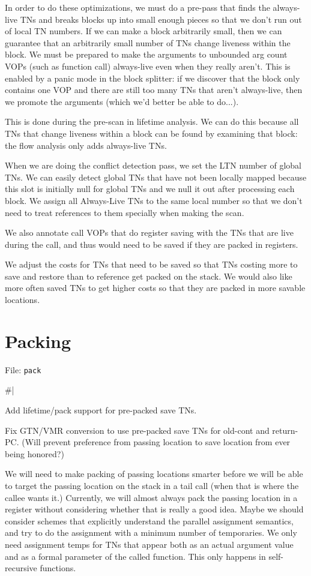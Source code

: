 In order to do these optimizations, we must do a pre-pass that finds the
always-live TNs and breaks blocks up into small enough pieces so that we don't
run out of local TN numbers.  If we can make a block arbitrarily small, then we
can guarantee that an arbitrarily small number of TNs change liveness within
the block.  We must be prepared to make the arguments to unbounded arg count
VOPs (such as function call) always-live even when they really aren't.  This is
enabled by a panic mode in the block splitter: if we discover that the block
only contains one VOP and there are still too many TNs that aren't always-live,
then we promote the arguments (which we'd better be able to do...).

This is done during the pre-scan in lifetime analysis.  We can do this because
all TNs that change liveness within a block can be found by examining that
block: the flow analysis only adds always-live TNs.


When we are doing the conflict detection pass, we set the LTN number of global
TNs.  We can easily detect global TNs that have not been locally mapped because
this slot is initially null for global TNs and we null it out after processing
each block.  We assign all Always-Live TNs to the same local number so that we
don't need to treat references to them specially when making the scan.

We also annotate call VOPs that do register saving with the TNs that are live
during the call, and thus would need to be saved if they are packed in
registers.

We adjust the costs for TNs that need to be saved so that TNs costing more to
save and restore than to reference get packed on the stack.  We would also like
more often saved TNs to get higher costs so that they are packed in more
savable locations.


\chapter{Packing}

File: {\tt pack}

\#|

Add lifetime/pack support for pre-packed save TNs.

Fix GTN/VMR conversion to use pre-packed save TNs for old-cont and return-PC.
(Will prevent preference from passing location to save location from ever being
honored?)

We will need to make packing of passing locations smarter before we will be
able to target the passing location on the stack in a tail call (when that is
where the callee wants it.)  Currently, we will almost always pack the passing
location in a register without considering whether that is really a good idea.
Maybe we should consider schemes that explicitly understand the parallel
assignment semantics, and try to do the assignment with a minimum number of
temporaries.  We only need assignment temps for TNs that appear both as an
actual argument value and as a formal parameter of the called function.  This
only happens in self-recursive functions.

